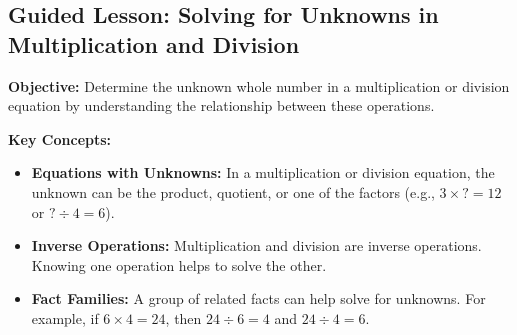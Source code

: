 \documentclass[11pt]{article}
\title{}
\date{}
\begin{document}
\subsection*{Guided Lesson: Solving for Unknowns in Multiplication and Division}
\onehalfspacing

\begin{tcolorbox}[colframe=black!40, colback=gray!5, 
coltitle=black, colbacktitle=black!20, fonttitle=\bfseries\Large, 
title=Learning Objective, halign title=center, left=5pt, right=5pt, top=5pt, bottom=15pt]
\textbf{Objective:} Determine the unknown whole number in a multiplication or division equation by understanding the relationship between these operations.
\end{tcolorbox}

\vspace{1em}

\begin{tcolorbox}[colframe=black!60, colback=white, 
coltitle=black, colbacktitle=black!15, fonttitle=\bfseries\Large, 
title=Key Concepts and Vocabulary, halign title=center, left=10pt, right=10pt, top=10pt, bottom=15pt]
\textbf{Key Concepts:}
\begin{itemize}
    \item \textbf{Equations with Unknowns:} In a multiplication or division equation, the unknown can be the product, quotient, or one of the factors (e.g., \(3 \times ? = 12\) or \(? \div 4 = 6\)).
    \item \textbf{Inverse Operations:} Multiplication and division are inverse operations. Knowing one operation helps to solve the other.
    \item \textbf{Fact Families:} A group of related facts can help solve for unknowns. For example, if \(6 \times 4 = 24\), then \(24 \div 6 = 4\) and \(24 \div 4 = 6\).
\end{itemize}
\end{tcolorbox}

\vspace{1em}
\end{document}
